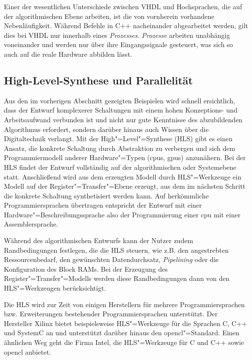 Einer der wesentlichen Unterschiede zwischen VHDL und Hochsprachen, die auf
der algorithmischen Ebene arbeiten, ist die von vornherein vorhandene
Nebenläufigkeit. Während Befehle in C++ nacheinander abgearbeitet werden, gilt
dies bei VHDL nur innerhalb eines \textit{Prozesses}. \textit{Prozesse} arbeiten
unabhängig voneinander und werden nur über ihre Eingangssignale gesteuert, was
sich so auch auf die reale Hardware abbilden lässt. \cite[vgl.][25]{kesel2013}

\subsection{High-Level-Synthese und Parallelität}\label{fpga:entwicklung:hls}

Aus den im vorherigen Abschnitt gezeigten Beispielen wird schnell ersichtlich,
dass der Entwurf komplexerer Schaltungen mit einem hohen Konzeptions- und
Arbeitsaufwand verbunden ist und nicht nur gute Kenntnisse des  abzubildenden
Algorithmus erfordert, sondern darüber hinaus auch Wissen über die
Digitaltechnik verlangt. Mit der High"=Level"=Synthese (HLS) gibt es einen
Ansatz, die konkrete Schaltung durch Abstraktion zu verbergen und sich dem
Programmiermodell anderer Hardware"=Typen (\gls{cpu}s, \gls{gpu}s) anzunähern.
Bei der HLS findet der Entwurf vollständig auf der algorithmischen oder
Systemebene statt. Anschließend wird aus dem erzeugten Modell durch
HLS"=Werkzeuge ein Modell auf der Register"=Transfer"=Ebene erzeugt, aus dem im
nächsten Schritt die konkrete Schaltung synthetisiert werden kann. Auf
herkömmliche Programmiersprachen übertragen entspricht der Entwurf mit einer
Hardware"=Beschreibungssprache also der Programmierung einer \gls{cpu} mit einer
Assemblersprache.
\cite[vgl.][7]{hlsintro2019}

Während des algorithmischen Entwurfs kann der Nutzer zudem Randbedingungen
festlegen, die die HLS steuern, wie z.B. den angestrebten Ressourcenbedarf,
den gewünschten Datendurchsatz, \textit{Pipelining} oder die
Konfiguration des Block RAMs. Bei der Erzeugung des Register"=Transfer"=Modells
werden diese Randbedingungen dann von den HLS"=Werkzeugen berücksichtigt.
\cite[vgl.][482]{kesel2013}

Die HLS wird zur Zeit von einigen Herstellern für mehrere Programmiersprachen
bzw. Erweiterungen bestehender Programmiersprachen unterstützt. Der Hersteller
Xilinx bietet beispielsweise HLS"=Werkzeuge für die Sprachen C, C++ und SystemC
an und unterstützt darüber hinaus den \gls{opencl}"=Standard. Einen ähnlichen
Weg geht die Firma Intel, die HLS"=Werkzeuge für C und C++ sowie \gls{opencl}
anbietet.

